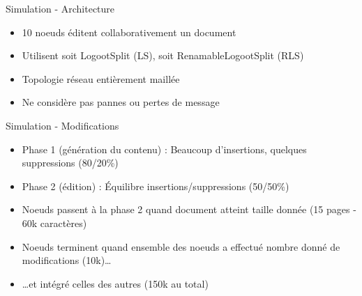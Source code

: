\begin{frame}{Simulation - Architecture}
\begin{figure}
{
    }
  \end{figure}
  \begin{itemize}
    \item 10 noeuds éditent collaborativement un document
    \item Utilisent soit LogootSplit (LS), soit RenamableLogootSplit (RLS)
  \end{itemize}
  \begin{itemize}
    \item Topologie réseau entièrement maillée
    \item Ne considère pas pannes ou pertes de message
   \end{itemize}
\end{frame}

\begin{frame}{Simulation - Modifications}
  \begin{itemize}
    \item Phase 1 (génération du contenu) : Beaucoup d'insertions, quelques suppressions (80/20\%)
    \item Phase 2 (édition) : Équilibre insertions/suppressions (50/50\%)
    \item Noeuds passent à la phase 2 quand document atteint taille donnée (15 pages - 60k caractères)
  \end{itemize}
  \begin{itemize}
    \item Noeuds terminent quand ensemble des noeuds a effectué nombre donné de modifications (10k)\dots
    \item \dots et intégré celles des autres (150k au total)
  \end{itemize}
\end{frame}

